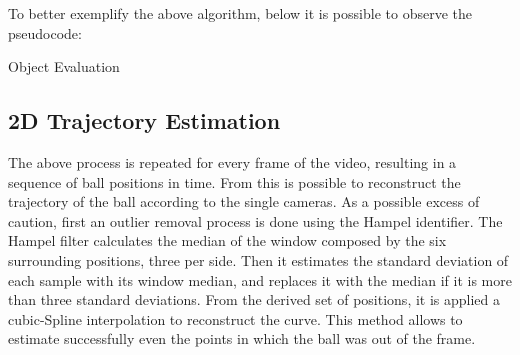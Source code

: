 \documentclass[a4paper]{article}
\begin{document}
To better exemplify the above algorithm, below it is possible to observe the pseudocode:
\begin{algorithm}[H]
\caption{Object Evaluation}
\begin{algorithmic}
 
 
\Else {}
\EndIf
{} 
	\EndIf
\EndIf
\EndFor

\end{algorithmic}
\end{algorithm}

\subsection{2D Trajectory Estimation}
The above process is repeated for every frame of the video, resulting in a sequence of ball positions in time. From this is possible to reconstruct the trajectory of the ball according to the single cameras.
As a possible excess of caution, first an outlier removal process is done using the Hampel identifier. The Hampel filter calculates the median of the window composed by the six surrounding positions, three per side. Then it estimates the standard deviation of each sample with its window median, and replaces it with the median if it is more than three standard deviations.
From the derived set of positions, it is applied a cubic-Spline interpolation to reconstruct the curve. This method allows to estimate successfully even the points in which the ball was out of the frame.
\end{document}
